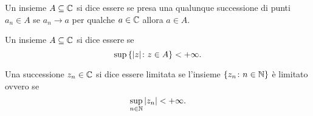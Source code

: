 \begin{definition}
Un insieme $A\subseteq {\mathbb C}$ si dice
essere 
se presa una qualunque successione
di punti $a_n\in A$ se $a_n \to a$ per qualche $a\in {\mathbb C}$
allora $a\in A$.
\end{definition}

\begin{definition}[limitatezza]
Un insieme $A\subseteq {\mathbb C}$ si dice essere 
se
\[
  \sup {\left\{  {\left|z\right|}\colon z \in A \right\}} < +\infty.
\]

Una successione $z_n\in {\mathbb C}$ si dice essere limitata se l'insieme
${\left\{ z_n\colon n\in {\mathbb N} \right\}}$ è limitato ovvero se
\[
  \sup_{n\in {\mathbb N}} {\left|z_n\right|} < +\infty.
\]
\end{definition}

\begin{comment} 
\begin{definition}[disco]
Dato $R\ge 0$ si può definire il disco complesso di raggio $R$ come
l'insieme $D_R\subset \CC$ definito da
\[
  D_R = \ENCLOSE{z\in \CC\colon \abs{z} \le R}.
\]
Geometricamente si tratta di un cerchio pieno di raggio $R$ centrato in $0$.
\end{definition}

\begin{theorem}[il disco è chiuso e limitato]
Per ogni $R\in [0,+\infty)$ il disco $D_R$ è un sottoinsieme di $C$ non vuoto, chiuso e limitato.
\end{theorem}
%
\begin{proof}
Per ogni $R\ge 0$ si ha $0\in D_R$ e quindi $D_R$ non è mai vuoto.

Che $D_R$ sia limitato è pure ovvio,
in quanto dato $z\in D_R$ si ha per
definizione $\abs{z}\le R$ e dunque $\sup_{z\in D_R} \abs{z} = R < +\infty$.

Per dimostrare che $D_R$ è chiuso consideriamo una qualunque successione $a_n \in D_R$. Sappiamo dunque che $\abs{a_n} \le R$
cioè $R-\abs{a_n} \ge 0$ per ogni $n\in \NN$.
Per la continuità del modulo sappiamo che $R-\abs{a_n}\to R-\abs{a}$
e per il teorema della permanenza del segno possiamo concludere che $R-\abs{a}\ge 0$ cioè che $\abs{a}\le R$ ovvero $a \in D_R$. Come volevamo dimostrare.
\end{proof}
\end{comment}

